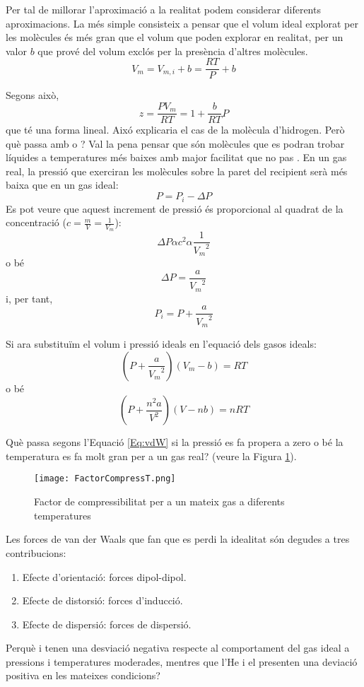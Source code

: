 Per tal de millorar l'aproximació a la realitat podem considerar diferents aproximacions. La més simple consisteix a pensar que el volum ideal explorat per les molècules és més gran que el volum que poden explorar en realitat, per un valor $b$ que prové del volum exclós per la presència d'altres molècules.
\[V_m = V_{m,i}+b=\frac{RT}{P}+b\]

Segons això,
\[z=\frac{PV_m}{RT}=1+\frac{b}{RT}P\]
que té una forma lineal. Aixó explicaria el cas de la molècula d'hidrogen.
Però què passa amb  o ? Val la pena pensar que són molècules que es podran trobar líquides a temperatures més baixes amb major facilitat que no pas . En un gas real, la pressió que exerciran les molècules sobre la paret del recipient serà més baixa que en un gas ideal:
\[P=P_i -\Delta P\]
Es pot veure que aquest increment de pressió és proporcional al quadrat de la concentració ($c=\frac{m}{V}=\frac{1}{V_m}$):
\[\Delta P \alpha c^2 \alpha \frac{1}{{V_m}^2} \]
o bé
\[\Delta P = \frac{a}{{V_m}^2}\]
i, per tant, 
\[ P_i=P+\frac{a}{{V_m}^2}\]

Si ara substituïm el volum i pressió ideals en l'equació dels gasos ideals:
\[
\left( P + \frac{a}{{V_m}^2} \right) (V_m -b)=RT
\]
o bé
\begin{equation}
\left( P + \frac{n^2 a}{V^2} \right) (V -nb)=nRT
\label{Eq:vdW}
\end{equation}

\begin{exr}
Què passa segons l'Equació \ref{Eq:vdW} si la pressió es fa propera a zero o bé la temperatura es fa molt gran per a un gas real? (veure la Figura \ref{fig:FactorCompressT}).
\end{exr}

\begin{figure}[h]
\centering
\texttt{[image: FactorCompressT.png]}
\caption{Factor de compressibilitat per a un mateix gas a diferents temperatures}
\label{fig:FactorCompressT}
\end{figure}

Les forces de van der Waals que fan que es perdi la idealitat són degudes a tres contribucions:
\begin{enumerate}
\item Efecte d'orientació: forces dipol-dipol.
\item Efecte de distorsió: forces d'inducció.
\item Efecte de dispersió: forces de dispersió.
\end{enumerate}

\begin{exr}
Perquè  i  tenen una desviació negativa respecte al comportament del gas ideal a pressions i temperatures moderades, mentres que l'He i el  presenten una deviació positiva en les mateixes condicions?
\end{exr}
